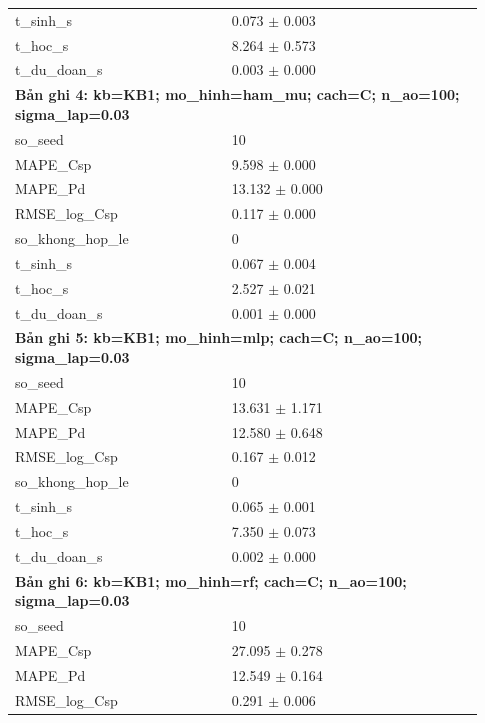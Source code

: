\begin{longtable}{p{0.43\linewidth}p{0.50\linewidth}}
t\_\allowbreak sinh\_\allowbreak s & 0.073 $\pm$ 0.003 \\
t\_\allowbreak hoc\_\allowbreak s & 8.264 $\pm$ 0.573 \\
t\_\allowbreak du\_\allowbreak doan\_\allowbreak s & 0.003 $\pm$ 0.000 \\
\midrule
\multicolumn{2}{p{0.95\linewidth}}{\textbf{Bản ghi 4: kb=KB1; mo\_hinh=ham\_mu; cach=C; n\_ao=100; sigma\_lap=0.03}} \\
so\_\allowbreak seed & 10 \\
MAPE\_\allowbreak Csp & 9.598 $\pm$ 0.000 \\
MAPE\_\allowbreak Pd & 13.132 $\pm$ 0.000 \\
RMSE\_\allowbreak log\_\allowbreak Csp & 0.117 $\pm$ 0.000 \\
so\_\allowbreak khong\_\allowbreak hop\_\allowbreak le & 0 \\
t\_\allowbreak sinh\_\allowbreak s & 0.067 $\pm$ 0.004 \\
t\_\allowbreak hoc\_\allowbreak s & 2.527 $\pm$ 0.021 \\
t\_\allowbreak du\_\allowbreak doan\_\allowbreak s & 0.001 $\pm$ 0.000 \\
\midrule
\multicolumn{2}{p{0.95\linewidth}}{\textbf{Bản ghi 5: kb=KB1; mo\_hinh=mlp; cach=C; n\_ao=100; sigma\_lap=0.03}} \\
so\_\allowbreak seed & 10 \\
MAPE\_\allowbreak Csp & 13.631 $\pm$ 1.171 \\
MAPE\_\allowbreak Pd & 12.580 $\pm$ 0.648 \\
RMSE\_\allowbreak log\_\allowbreak Csp & 0.167 $\pm$ 0.012 \\
so\_\allowbreak khong\_\allowbreak hop\_\allowbreak le & 0 \\
t\_\allowbreak sinh\_\allowbreak s & 0.065 $\pm$ 0.001 \\
t\_\allowbreak hoc\_\allowbreak s & 7.350 $\pm$ 0.073 \\
t\_\allowbreak du\_\allowbreak doan\_\allowbreak s & 0.002 $\pm$ 0.000 \\
\midrule
\multicolumn{2}{p{0.95\linewidth}}{\textbf{Bản ghi 6: kb=KB1; mo\_hinh=rf; cach=C; n\_ao=100; sigma\_lap=0.03}} \\
so\_\allowbreak seed & 10 \\
MAPE\_\allowbreak Csp & 27.095 $\pm$ 0.278 \\
MAPE\_\allowbreak Pd & 12.549 $\pm$ 0.164 \\
RMSE\_\allowbreak log\_\allowbreak Csp & 0.291 $\pm$ 0.006 \\

\end{longtable}
